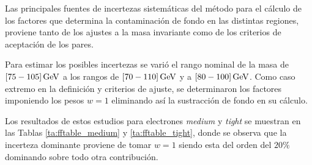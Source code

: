 
Las principales fuentes de incertezas sistemáticas del método para el cálculo de los factores que determina la contaminación de fondo en las distintas regiones, proviene tanto de los ajustes a la masa invariante como de los criterios de aceptación de los pares.  

Para estimar los posibles incertezas se varió el rango nominal de la masa de $[75-105]\, \mathrm{GeV}$ a los rangos de $[70-110]\, \mathrm{GeV}$ y a $[80-100]\, \mathrm{GeV}$. Como caso extremo en la definición y criterios de ajuste, se determinaron los factores imponiendo los pesos $w=1$ eliminando así la sustracción de fondo en su cálculo. 

Los resultados de estos estudios para electrones \textit{medium} y \textit{tight} se muestran en las Tablas \ref{ta:fftable_medium} y \ref{ta:fftable_tight}, donde se observa que la incerteza dominante proviene de tomar $w=1$ siendo esta del orden del $20 \%$ dominando sobre todo otra contribución.





